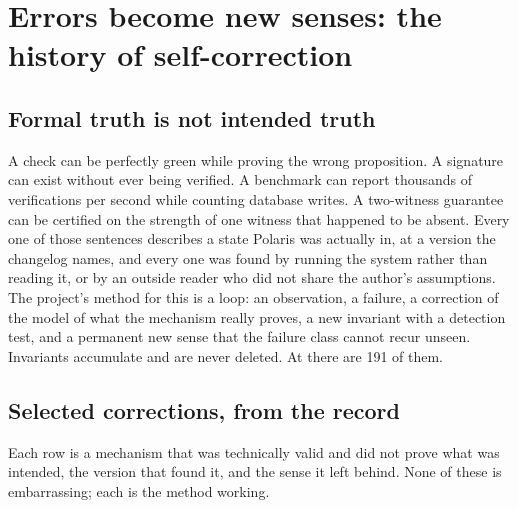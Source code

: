 \section{Errors become new senses: the history of self-correction}
\label{sec:senses}

\subsection{Formal truth is not intended truth}

A check can be perfectly green while proving the wrong proposition. A signature can exist without
ever being verified. A benchmark can report thousands of verifications per second while counting
database writes. A two-witness guarantee can be certified on the strength of one witness that
happened to be absent. Every one of those sentences describes a state Polaris was actually in, at a
version the changelog names, and every one was found by running the system rather than reading it,
or by an outside reader who did not share the author's assumptions. The project's method for this is
a loop: an observation, a failure, a correction of the model of what the mechanism really proves, a
new invariant with a detection test, and a permanent new sense that the failure class cannot recur
unseen. Invariants accumulate and are never deleted. At  there are 191 of them.


\subsection{Selected corrections, from the record}

Each row is a mechanism that was technically valid and did not prove what was intended, the version
that found it, and the sense it left behind. None of these is embarrassing; each is the method
working.

